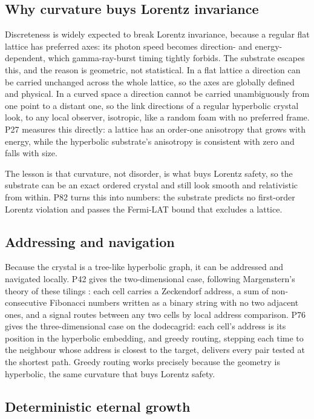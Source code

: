 \subsection{Why curvature buys Lorentz invariance}

Discreteness is widely expected to break Lorentz invariance, because a regular flat lattice has
preferred axes: its photon speed becomes direction- and energy-dependent, which gamma-ray-burst
timing tightly forbids. The substrate escapes this, and the reason is geometric, not statistical.
In a flat lattice a direction can be carried unchanged across the whole lattice, so the axes are
globally defined and physical. In a curved space a direction cannot be carried unambiguously from
one point to a distant one, so the link directions of a regular hyperbolic crystal look, to any
local observer, isotropic, like a random foam with no preferred frame. P27 measures this directly:
a lattice has an order-one anisotropy that grows with energy, while the hyperbolic substrate's
anisotropy is consistent with zero and falls with size.

 The lesson is that curvature, not disorder,
is what buys Lorentz safety, so the substrate can be an exact ordered crystal and still look smooth
and relativistic from within. P82 turns this into numbers: the substrate predicts no first-order
Lorentz violation and passes the Fermi-LAT bound that excludes a lattice.

\subsection{Addressing and navigation}

Because the crystal is a tree-like hyperbolic graph, it can be addressed and navigated locally. P42
gives the two-dimensional case, following Margenstern's theory of these tilings \citep{margenstern2003theory}:
each cell carries a Zeckendorf address, a sum of non-consecutive Fibonacci numbers written as a
binary string with no two adjacent ones, and a signal routes between any two cells by local address
comparison. P76 gives the three-dimensional case on the dodecagrid:
each cell's address is its position in the hyperbolic embedding, and greedy routing, stepping each
time to the neighbour whose address is closest to the target, delivers every pair tested at the
shortest path. Greedy routing works precisely because the geometry is hyperbolic, the same curvature
that buys Lorentz safety.

\subsection{Deterministic eternal growth}

